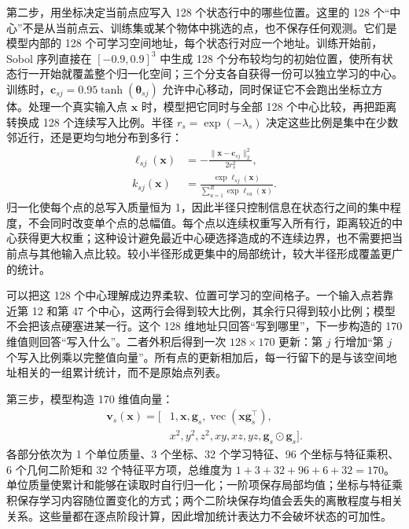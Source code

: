 \documentclass[UTF8,a4paper,11pt,fontset=windows]{ctexart}
\newcommand{\vect}{\operatorname{vec}}
\begin{document}
第二步，用坐标决定当前点应写入 128 个状态行中的哪些位置。这里的 128 个“中心”不是从当前点云、训练集或某个物体中挑选的点，也不保存任何观测。它们是模型内部的 128 个可学习空间地址，每个状态行对应一个地址。训练开始前，Sobol 序列直接在 $[-0.9,0.9]^3$ 中生成 128 个分布较均匀的初始位置，使所有状态行一开始就覆盖整个归一化空间；三个分支各自获得一份可以独立学习的中心。训练时，$\bm c_{sj}=0.95\tanh(\bm\theta_{sj})$ 允许中心移动，同时保证它不会跑出坐标立方体。处理一个真实输入点 $\bm x$ 时，模型把它同时与全部 128 个中心比较，再把距离转换成 128 个连续写入比例。半径 $r_s=\exp(-\lambda_s)$ 决定这些比例是集中在少数邻近行，还是更均匀地分布到多行：
\begin{align}
\ell_{sj}(\bm x)&=-\frac{\|\bm x-\bm c_{sj}\|_2^2}{2r_s^2},\\
k_{sj}(\bm x)&=\frac{\exp \ell_{sj}(\bm x)}{\sum_{u=1}^{R}\exp \ell_{su}(\bm x)}.
\label{eq:key}
\end{align}
归一化使每个点的总写入质量恒为 1，因此半径只控制信息在状态行之间的集中程度，不会同时改变单个点的总幅值。每个点以连续权重写入所有行，距离较近的中心获得更大权重；这种设计避免最近中心硬选择造成的不连续边界，也不需要把当前点与其他输入点比较。较小半径形成更集中的局部统计，较大半径形成覆盖更广的统计。

可以把这 128 个中心理解成边界柔软、位置可学习的空间格子。一个输入点若靠近第 12 和第 47 个中心，这两行会得到较大比例，其余行只得到较小比例；模型不会把该点硬塞进某一行。这个 128 维地址只回答“写到哪里”，下一步构造的 170 维值则回答“写入什么”。二者外积后得到一次 $128\times170$ 更新：第 $j$ 行增加“第 $j$ 个写入比例乘以完整值向量”。所有点的更新相加后，每一行留下的是与该空间地址相关的一组累计统计，而不是原始点列表。

第三步，模型构造 170 维值向量：
\begin{equation}
\begin{aligned}
\bm v_s(\bm x)=[&1,\bm x,\bm g_s,\vect(\bm x\bm g_s^\top),\\
&x^2,y^2,z^2,xy,xz,yz,\bm g_s\odot\bm g_s].
\end{aligned}
\label{eq:value}
\end{equation}
各部分依次为 1 个单位质量、3 个坐标、32 个学习特征、96 个坐标与特征乘积、6 个几何二阶矩和 32 个特征平方项，总维度为 $1+3+32+96+6+32=170$。单位质量使累计和能够在读取时自行归一化；一阶项保存局部均值；坐标与特征乘积保存学习内容随位置变化的方式；两个二阶块保存均值会丢失的离散程度与相关关系。这些量都在逐点阶段计算，因此增加统计表达力不会破坏状态的可加性。
\end{document}
